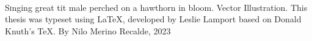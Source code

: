 \documentclass[9pt, twocolumn, twoside]{nilosthesis}
\begin{document}
\thispagestyle{empty}
\onecolumn 
\normalsize
 \vspace*{5cm} %
\begin{center}
    \\[2cm]
\parbox{200pt}{\color{lightgray} \lettrine[lines=2]Singing great tit male perched on a hawthorn in bloom. Vector Illustration. This thesis was typeset using \LaTeX, developed by Leslie Lamport based on Donald Knuth's \TeX. By Nilo Merino Recalde, 2023}
\end{center}
\end{document}
